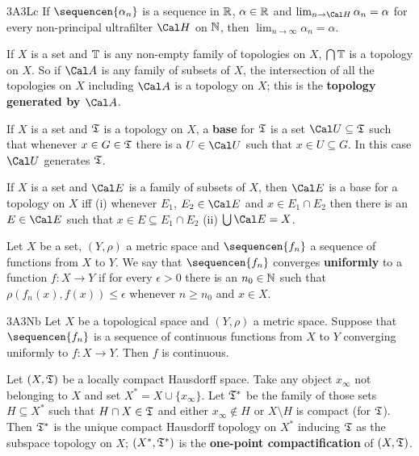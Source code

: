 \spheader 3A3Lc If $\sequencen{\alpha_n}$ is a sequence
in $\Bbb R$, $\alpha\in\Bbb R$ and $\lim_{n\to\Cal H}\alpha_n=\alpha$
for every non-principal ultrafilter
$\Cal H$ on $\Bbb N$, then
$\lim_{n\to\infty}\alpha_n=\alpha$.

 If $X$ is a set and $\Bbb T$ is any
non-empty family of topologies on $X$, $\bigcap\Bbb T$ is a topology on
$X$.   So if $\Cal A$ is any
family of subsets of $X$, the intersection of all the topologies on $X$
including $\Cal A$ is a topology on $X$;  this is the
{\bf topology generated by $\Cal A$}.

 If $X$ is a set and $\frak T$ is a topology on
$X$, a {\bf base} for $\frak T$ is a set $\Cal U\subseteq\frak T$ such
that whenever $x\in G\in\frak T$ there is a $U\in\Cal U$ such that
$x\in U\subseteq G$.
In this case $\Cal U$ generates $\frak T$.

 If $X$ is a set and $\Cal E$ is a family of
subsets of $X$, then $\Cal E$ is a base for a topology on $X$ iff (i)
whenever $E_1$, $E_2\in\Cal E$ and $x\in E_1\cap E_2$ then there is an
$E\in\Cal E$ such that $x\in E\subseteq E_1\cap E_2$ (ii) $\bigcup\Cal
E=X$.  

 Let $X$ be a set, $(Y,\rho)$ a
metric space and
$\sequencen{f_n}$ a sequence of functions from $X$ to $Y$.   We say
that $\sequencen{f_n}$ converges {\bf uniformly} to a function
$f:X\to Y$ if for every $\epsilon>0$ there is an $n_0\in\Bbb N$ such
that $\rho(f_n(x),f(x))\le\epsilon$ whenever $n\ge n_0$ and $x\in X$.

\spheader 3A3Nb Let $X$ be a topological space and $(Y,\rho)$ a metric
space.   Suppose that $\sequencen{f_n}$ is a
sequence of continuous functions from $X$ to $Y$ converging uniformly
to $f:X\to Y$.   Then $f$ is continuous.  \cmmnt{$*$}

 Let $(X,\frak T)$ be a
locally compact Hausdorff space.   Take any object $x_{\infty}$ not
belonging to $X$ and set $X^*=X\cup\{x_{\infty}\}$.   Let $\frak T^*$ be
the family of those sets $H\subseteq X^*$ such that $H\cap X\in\frak T$
and either $x_{\infty}\notin H$ or $X\setminus H$ is compact (for
$\frak T$).   Then $\frak T^*$ is the unique compact Hausdorff topology on
$X^*$ inducing $\frak T$ as the subspace topology on $X$;
$(X^*,\frak T^*)$ is the {\bf one-point compactification}
of $(X,\frak T)$.   

